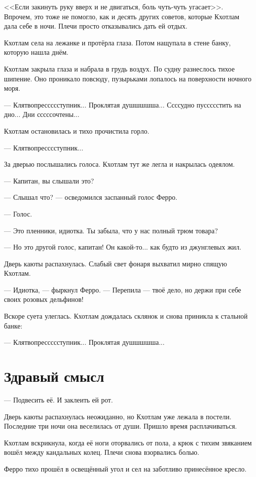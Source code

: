 <<Если закинуть руку вверх и не двигаться, боль чуть-чуть угасает>>.
Впрочем, это тоже не помогло, как и десять других советов, которые Кхотлам дала себе в ночи.
Плечи просто отказывались дать ей отдых.

Кхотлам села на лежанке и протёрла глаза.
Потом нащупала в стене банку, которую нашла днём.

Кхотлам закрыла глаза и набрала в грудь воздух.
По судну разнеслось тихое шипение.
Оно проникало повсюду, пузырьками лопалось на поверхности ночного моря.

--- Клятвопрессссступник...
Проклятая душшшшша...
Ссссудно пуссссстить на дно...
Дни сссссочтены...

Кхотлам остановилась и тихо прочистила горло.

--- Клятвопресссступник...

За дверью послышались голоса.
Кхотлам тут же легла и накрылась одеялом.

--- Капитан, вы слышали это?

--- Слышал что? --- осведомился заспанный голос Ферро.

--- Голос.

--- Это пленники, идиотка.
Ты забыла, что у нас полный трюм товара?

--- Но это другой голос, капитан!
Он какой-то... как будто из джунглевых жил.

Дверь каюты распахнулась.
Слабый свет фонаря выхватил мирно спящую Кхотлам.

--- Идиотка, --- фыркнул Ферро.
--- Перепила --- твоё дело, но держи при себе своих розовых дельфинов!

Вскоре суета улеглась.
Кхотлам дождалась склянок и снова приникла к стальной банке:

--- Клятвопрессссступник...
Проклятая душшшшша...

\section{Здравый смысл}

--- Подвесить её.
И заклеить ей рот.

Дверь каюты распахнулась неожиданно, но Кхотлам уже лежала в постели.
Последние три ночи она веселилась от души.
Пришло время расплачиваться.

Кхотлам вскрикнула, когда её ноги оторвались от пола, а крюк с тихим звяканием вошёл между кандальных колец.
Плечи снова взорвались болью.

Ферро тихо прошёл в освещённый угол и сел на заботливо принесённое кресло.

